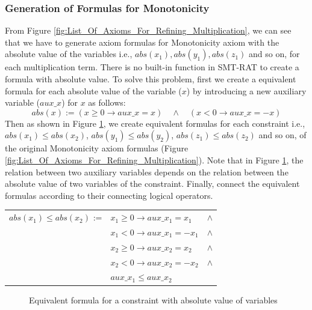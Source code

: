 \subsubsection{Generation of Formulas for Monotonicity}
\label{subsubsec:Generation_of_Formulas_ for_Monotonicity}
From Figure \ref{fig:List_Of_Axioms_For_Refining_Multiplication}, we can see that we have to generate axiom formulas for Monotonicity axiom with the absolute value of the variables i.e., $abs(x_{1}), abs(y_{1}), abs(z_{1})$ and so on, for each multiplication term.
There is no built-in function in SMT-RAT to create a formula with absolute value.
To solve this problem, first we create a equivalent formula for each absolute value of the variable ($x$) by introducing a new auxiliary variable ($aux\_x$) for $x$ as follows:
$$abs(x):= (x \geq 0 \to aux\_x = x) \quad \wedge \quad (x < 0 \to aux\_x = -x)$$
Then as shown in Figure \ref{fig:Equivalent_formula_for_a_constraint_with_absolute_value_of_variable}, we create equivalent formulas for each constraint i.e., $abs(x_{1}) \leq abs(x_{2})$, $abs(y_{1}) \leq abs(y_{2})$, $abs(z_{1}) \leq abs(z_{2})$ and so on, of the original Monotonicity axiom formulas (Figure \ref{fig:List_Of_Axioms_For_Refining_Multiplication}).
Note that in Figure \ref{fig:Equivalent_formula_for_a_constraint_with_absolute_value_of_variable}, the relation between two auxiliary variables depends on the relation between the absolute value of two variables of the constraint.
Finally, connect the equivalent formulas according to their connecting logical operators.\newline

\begin{table}[!ht]
\centering
\begin{tabular}{clc}
$abs(x_{1}) \leq abs(x_{2})$ := & $x_{1} \geq 0 \to aux\_x_{1} = x_{1}$  & $\wedge$  \\ 
  & $x_{1} < 0 \to aux\_x_{1} = -x_{1}$  & $\wedge$  \\ 
  & $x_{2} \geq 0 \to aux\_x_{2} = x_{2}$  & $\wedge$  \\ 
  & $x_{2} < 0 \to aux\_x_{2} = -x_{2}$  & $\wedge$  \\ 
  & $aux\_x_{1} \leq aux\_x_{2}$ &  \\ 
\end{tabular}
\end{table}
\begin{figure}[ht!]
\caption{Equivalent formula for a constraint with absolute value of variables}
\label{fig:Equivalent_formula_for_a_constraint_with_absolute_value_of_variable}
\end{figure}

